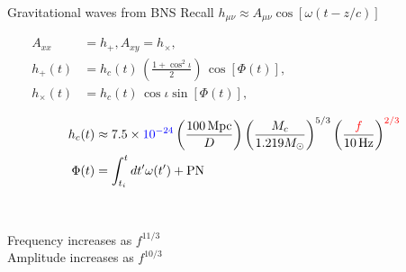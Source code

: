 \documentclass[xcolor=dvipsnames,t]{beamer}
\newcommand{\red}[1]{\textcolor{red}{#1}}
\newcommand{\bl}[1]{\textcolor{blue}{#1}}
\newcommand{\f}{\frac}
\newcommand{\nn}{\nonumber}
\begin{document}
\begin{frame}{Gravitational waves from BNS}
    Recall $h_{\mu \nu} \approx A_{\mu\nu}\cos\left[\omega (t-z/c)\right]$ \\
    \begin{small}
    {
      \begin{align*}
      A_{xx}&=h_+, A_{xy} = h_\times, \\
      h_+(t) &= h_c(t)\, \left(\f{1+\cos^2\iota}{2}\right)\, \cos[\Phi(t)],\hspace{5cm}\\
      h_\times(t) & =h_c(t)\,\cos\iota \sin[\Phi(t)],
      \end{align*}
    }
  \end{small}
  \uncover<2->{$\iota =\,$ orbital \bl{inclination}}
  \vspace{-3mm}
  {
    \begin{small}
      \begin{align*}
      h_c(t) %
      &\approx 7.5\times \bl{10^{-24}} \left(\f{100\,\text{Mpc}}{D}\right)\left(\f{M_c}{1.219 M_\odot}\right)^{5/3}\left(\frac{\red{f}}{10\,\text{Hz}}\right)^{\red{2/3}} \\
      \Phi(t) &=\int_{t_i}^t dt' \omega(t') + \text{PN}
      \end{align*}
    \end{small}
    \\
  }
  {
    Frequency increases as $f^{11/3}$\\
    Amplitude increases as $f^{10/3} $
  }  
  {
    }
\end{frame}
\end{document}
